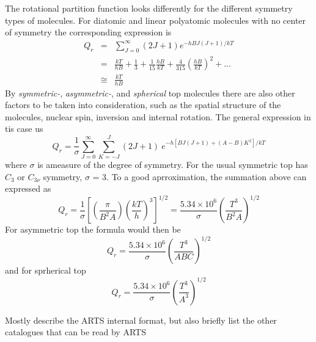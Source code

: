 {The rotational partition function looks differently for the different
symmetry types of molecules.
For diatomic and linear  polyatomic molecules with no center of
symmetry the corresponding expression is 
\begin{eqnarray}
Q_r & = & \sum_{J=0}^\infty (2J+1)e^{-hBJ(J+1)/kT}\nonumber\\
   & = & \frac{kT}{hB}+\frac{1}{3}+\frac{1}{15}\frac{hB}{kT}+\frac{4}{315}\left(\frac{hB}{kT}\right)^2+...\nonumber\\
   & \cong & \frac{kT}{hB}
\label{}
\end{eqnarray}
By {\it{symmetric-}}, {\it{asymmetric-}}, and {\it{spherical}} top molecules there are also
other factors to be taken into consideration, such as the
spatial structure of the molecules, nuclear spin, inversion and
internal rotation. The general expression in tis case us
\begin{equation}
Q_r  =  \frac{1}{\sigma}\sum_{J=0}^\infty \sum_{K=-J}^{J}(2J+1)~e^{-h[BJ(J+1)+(A-B)K^2]/kT}
\label{}
\end{equation}
where $\sigma$ is ameasure of the degree of symmetry. For the usual
symmetric top has $C_3$ or $C_{3\nu}$ symmetry, $\sigma$ = 3. To a good
aprroximation, the summation above can expressed as
\begin{equation}
Q_r  = 
\frac{1}{\sigma}\left[\left(\frac{\pi}{B^2A}\right)\left(\frac{kT}{h}\right)^3\right]^{1/2}=
\frac{5.34\times 10^6}{\sigma}\left(\frac{T^3}{B^{2}A}\right)^{1/2}
\label{}
\end{equation}
For asymmetric top the formula would then be 
\begin{equation}
Q_r = \frac{5.34\times 10^6}{\sigma}\left(\frac{T^3}{ABC}\right)^{1/2}
\label{}
\end{equation}
and for sprherical top
\begin{equation}
Q_r = \frac{5.34\times 10^6}{\sigma}\left(\frac{T^3}{A^3}\right)^{1/2}
\label{}
\end{equation}

















Mostly describe the ARTS internal format, but also briefly list the
other catalogues that can be read by ARTS


}
